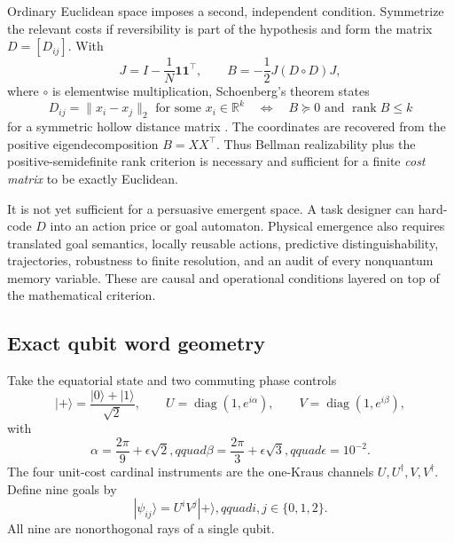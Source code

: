 \documentclass[11pt]{article}
\newcommand{\diag}{\operatorname{diag}}
\begin{document}
Ordinary Euclidean space imposes a second, independent condition. Symmetrize
the relevant costs if reversibility is part of the hypothesis and form the
matrix $D=[D_{ij}]$. With
\begin{equation}
 J=I-\frac1N\mathbf1\mathbf1^\top,
 \qquad B=-\frac12J(D\circ D)J, \label{eq:schoenberg-gram}
\end{equation}
where $\circ$ is elementwise multiplication, Schoenberg's theorem states
\begin{equation}
 D_{ij}=\|x_i-x_j\|_2\text{ for some }x_i\in\mathbb R^k
 \quad\Longleftrightarrow\quad
 B\succeq0\text{ and }\operatorname{rank}B\le k
 \label{eq:schoenberg-criterion}
\end{equation}
for a symmetric hollow distance matrix \cite{schoenberg1935,gower1966}.
The coordinates are recovered from the positive eigendecomposition
$B=X X^\top$. Thus Bellman realizability plus the positive-semidefinite rank
criterion is necessary and sufficient for a finite \emph{cost matrix} to be
exactly Euclidean.

It is not yet sufficient for a persuasive emergent space. A task designer can
hard-code $D$ into an action price or goal automaton. Physical emergence also
requires translated goal semantics, locally reusable actions, predictive
distinguishability, trajectories, robustness to finite resolution, and an
audit of every nonquantum memory variable. These are causal and operational
conditions layered on top of the mathematical criterion.

\subsection{Exact qubit word geometry}

Take the equatorial state and two commuting phase controls
\begin{equation}
 |+\rangle=\frac{|0\rangle+|1\rangle}{\sqrt2},\qquad
 U=\diag(1,e^{i\alpha}),\qquad V=\diag(1,e^{i\beta}),
 \label{eq:qubit-phase-controls}
\end{equation}
with
\begin{equation}
 \alpha=\frac{2\pi}{9}+\epsilon\sqrt2,qquad
 \beta=\frac{2\pi}{3}+\epsilon\sqrt3,qquad
 \epsilon=10^{-2}. \label{eq:irrational-phases}
\end{equation}
The four unit-cost cardinal instruments are the one-Kraus channels
$U,U^\dagger,V,V^\dagger$. Define nine goals by
\begin{equation}
 |\psi_{ij}\rangle=U^iV^j|+\rangle,qquad i,j\in\{0,1,2\}.
 \label{eq:qubit-nine-goals}
\end{equation}
All nine are nonorthogonal rays of a single qubit.
\end{document}
